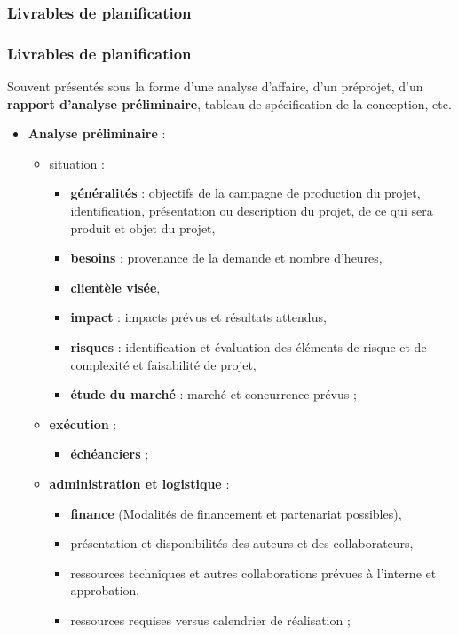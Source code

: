 \begin{frame}[allowframebreaks]
						
					\end{frame}

						\subsubsection{Livrables de planification} 
							\begin{frame}[allowframebreaks]
							\frametitle{Livrables de planification}
                        		Souvent présentés sous la forme d'une analyse d’affaire, d'un préprojet, d'un \textbf{rapport d’analyse préliminaire}, tableau de spécification de la conception, etc.
	
							\begin{itemize}
							\framebreak
							\item \textbf{Analyse préliminaire} :
								\begin{itemize}
								\item situation :
									\begin{itemize}
									\item \textbf{généralités} : objectifs de la campagne de production du projet, identification, présentation ou description du projet, de ce qui sera produit et objet du projet, 
									\item \textbf{besoins }: provenance de la demande et nombre d’heures,
									\item \textbf{clientèle visée},
									\item \textbf{impact} : impacts prévus et résultats attendus,
									\item \textbf{risques }: identification et évaluation des éléments de risque et de complexité et faisabilité de projet,										
									\item \textbf{étude du marché} : marché et concurrence prévus ;								
									\end{itemize}
								\framebreak
								\item \textbf{exécution} : 
									\begin{itemize}
									\item \textbf{échéanciers} ;
									\end{itemize}
								\item \textbf{administration et logistique} :
									\begin{itemize}
									\item \textbf{finance} (Modalités de financement et partenariat possibles),						
									\item présentation et disponibilités des auteurs et des collaborateurs,
									\item ressources techniques et autres collaborations prévues à l’interne et approbation,
									\item ressources requises versus calendrier de réalisation ;
									\end{itemize}
								\end{itemize}
							\framebreak
							

\end{itemize}
\end{frame}
